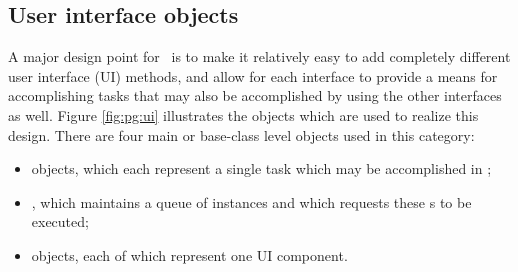 \subsection{User interface objects}

A major design point for \VMD\ is to make it relatively easy to add completely different user interface (UI) methods, and allow for each interface to provide a means for accomplishing tasks that may also be accomplished by using the other interfaces as well.  Figure \ref{fig:pg:ui} illustrates the objects which are used to realize this design.  There are four main or base-class level objects used in this category:
\begin{itemize}
  \item {} objects, which each represent a single task which may be accomplished in \VMD;
  \item {}, which maintains a queue of  instances and which requests these s to be executed;
  \item {} objects, each of which represent one UI component.
\end{itemize}

\begin{centering}
\end{centering}

